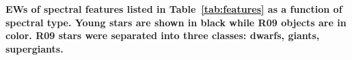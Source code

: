 {\bf EWs of spectral features listed in Table~\ref{tab:features} as a function of spectral type.  Young stars are shown in black while R09 objects are in color.  R09 stars were separated into three classes: dwarfs, giants, supergiants.\label{fig:EW-obs-R09}}